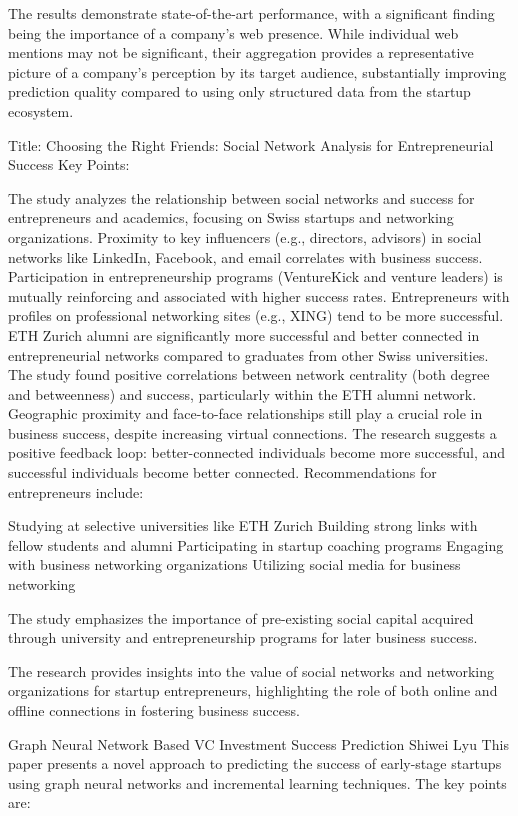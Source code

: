 \documentclass[a4paper, oneside]{discothesis}
\begin{document}
The results demonstrate state-of-the-art performance, with a significant finding being the importance of a company's web presence. While individual web mentions may not be significant, their aggregation provides a representative picture of a company's perception by its target audience, substantially improving prediction quality compared to using only structured data from the startup ecosystem.

Title: Choosing the Right Friends: Social Network Analysis for Entrepreneurial Success
Key Points:

The study analyzes the relationship between social networks and success for entrepreneurs and academics, focusing on Swiss startups and networking organizations.
Proximity to key influencers (e.g., directors, advisors) in social networks like LinkedIn, Facebook, and email correlates with business success.
Participation in entrepreneurship programs (VentureKick and venture leaders) is mutually reinforcing and associated with higher success rates.
Entrepreneurs with profiles on professional networking sites (e.g., XING) tend to be more successful.
ETH Zurich alumni are significantly more successful and better connected in entrepreneurial networks compared to graduates from other Swiss universities.
The study found positive correlations between network centrality (both degree and betweenness) and success, particularly within the ETH alumni network.
Geographic proximity and face-to-face relationships still play a crucial role in business success, despite increasing virtual connections.
The research suggests a positive feedback loop: better-connected individuals become more successful, and successful individuals become better connected.
Recommendations for entrepreneurs include:

Studying at selective universities like ETH Zurich
Building strong links with fellow students and alumni
Participating in startup coaching programs
Engaging with business networking organizations
Utilizing social media for business networking


The study emphasizes the importance of pre-existing social capital acquired through university and entrepreneurship programs for later business success.

The research provides insights into the value of social networks and networking organizations for startup entrepreneurs, highlighting the role of both online and offline connections in fostering business success.

Graph Neural Network Based VC Investment Success Prediction
Shiwei Lyu
This paper presents a novel approach to predicting the success of early-stage startups using graph neural networks and incremental learning techniques. The key points are:
\end{document}
